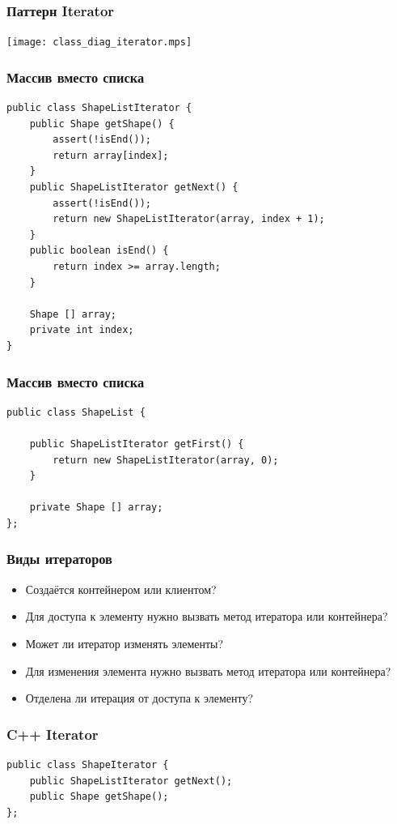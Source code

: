 \documentclass[handout]{beamer}
\begin{document}
\begin{frame}[fragile]
\frametitle{Паттерн Iterator}
\begin{center}
\texttt{[image: class\_diag\_iterator.mps]}
\end{center}
\end{frame}


\begin{frame}[fragile]
\frametitle{Массив вместо списка}
\begin{lstlisting}
public class ShapeListIterator {
    public Shape getShape() {
        assert(!isEnd());
        return array[index];
    }
    public ShapeListIterator getNext() {
        assert(!isEnd());
        return new ShapeListIterator(array, index + 1);
    }
    public boolean isEnd() {
        return index >= array.length;
    }

    Shape [] array;
    private int index;
}
\end{lstlisting}
\end{frame}


\begin{frame}[fragile]
\frametitle{Массив вместо списка}
\begin{lstlisting}
public class ShapeList {

    public ShapeListIterator getFirst() {
        return new ShapeListIterator(array, 0);
    }

    private Shape [] array;
};
\end{lstlisting}
\end{frame}


\begin{frame}[fragile]
\frametitle{Виды итераторов}
\begin{itemize}
\item Создаётся контейнером или клиентом?
\item Для доступа к элементу нужно вызвать метод итератора или контейнера?
\item Может ли итератор изменять элементы?
\item Для изменения элемента нужно вызвать метод итератора или контейнера?
\item Отделена ли итерация от доступа к элементу?
\end{itemize}
\end{frame}


\begin{frame}[fragile]
\frametitle{C++ Iterator}
\begin{lstlisting}
public class ShapeIterator {
    public ShapeListIterator getNext();
    public Shape getShape();
};
\end{lstlisting}
\end{frame}
\end{document}
